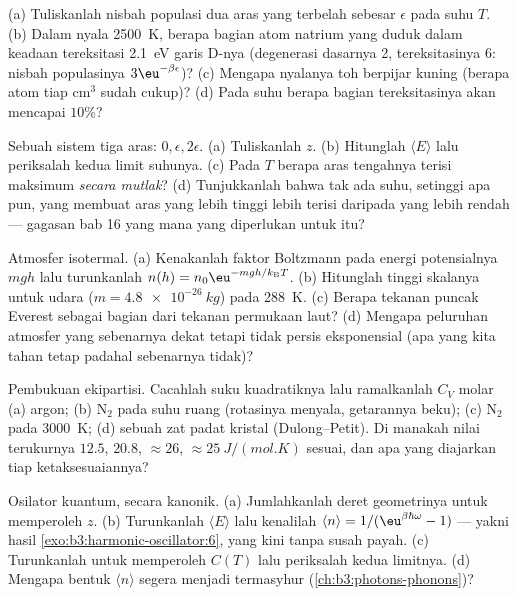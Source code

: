 \begin{exercise}[$\star$]\label{exo:b3:canonical-ensemble:1}
(a) Tuliskanlah nisbah populasi dua aras yang terbelah sebesar $\epsilon$
pada suhu $T$. (b) Dalam nyala \qty{2500}{K}, berapa bagian atom natrium
yang duduk dalam keadaan tereksitasi \qty{2.1}{eV} garis D-nya
(degenerasi dasarnya 2, tereksitasinya 6: nisbah populasinya
$3\eu^{-\beta\epsilon}$)?
(c) Mengapa nyalanya toh berpijar kuning (berapa atom tiap
cm$^3$ sudah cukup)? (d) Pada suhu berapa bagian tereksitasinya akan
mencapai $10\%$?
\end{exercise}

\begin{exercise}[$\star$]\label{exo:b3:canonical-ensemble:2}
Sebuah sistem tiga aras: $0, \epsilon, 2\epsilon$. (a) Tuliskanlah $z$.
(b) Hitunglah $\langle E\rangle$ lalu periksalah kedua limit suhunya. (c)
Pada $T$ berapa aras tengahnya terisi maksimum \emph{secara mutlak}? (d)
Tunjukkanlah bahwa tak ada suhu, setinggi apa pun, yang membuat aras yang
lebih tinggi lebih terisi daripada yang lebih rendah --- gagasan bab 16
yang mana yang diperlukan untuk itu?
\end{exercise}

\begin{exercise}[$\star$]\label{exo:b3:canonical-ensemble:3}
Atmosfer isotermal. (a) Kenakanlah faktor Boltzmann pada energi
potensialnya $mgh$ lalu turunkanlah $n(h) = n_0\eu^{-mgh/k_{\text{B}}
T}$. (b) Hitunglah tinggi skalanya untuk udara ($m = \qty{4.8e-26}{kg}$)
pada \qty{288}{K}. (c) Berapa tekanan puncak Everest sebagai bagian dari
tekanan permukaan laut? (d) Mengapa peluruhan atmosfer yang sebenarnya
dekat tetapi tidak persis eksponensial (apa yang kita tahan tetap padahal
sebenarnya tidak)?
\end{exercise}

\begin{exercise}[$\star$]\label{exo:b3:canonical-ensemble:4}
Pembukuan ekipartisi. Cacahlah suku kuadratiknya lalu ramalkanlah $C_V$
molar (a) argon; (b) N$_2$ pada suhu ruang (rotasinya menyala,
getarannya beku); (c) N$_2$ pada \qty{3000}{K}; (d) sebuah zat padat
kristal (Dulong--Petit). Di manakah nilai terukurnya
$12.5$, $20.8$, $\approx26$, $\approx\qty{25}{J/(mol.K)}$ sesuai,
dan apa yang diajarkan tiap ketaksesuaiannya?
\end{exercise}

\begin{exercise}[$\star\star$]\label{exo:b3:canonical-ensemble:5}
Osilator kuantum, secara kanonik. (a) Jumlahkanlah deret geometrinya
untuk memperoleh $z$. (b) Turunkanlah $\langle E\rangle$ lalu kenalilah $\langle
n\rangle = 1/(\eu^{\beta\hbar\omega} - 1)$ --- yakni hasil
\cref{exo:b3:harmonic-oscillator:6}, yang kini tanpa susah payah. (c)
Turunkanlah untuk memperoleh $C(T)$ lalu periksalah kedua limitnya. (d)
Mengapa bentuk $\langle n\rangle$ segera menjadi termasyhur
(\cref{ch:b3:photons-phonons})?
\end{exercise}

